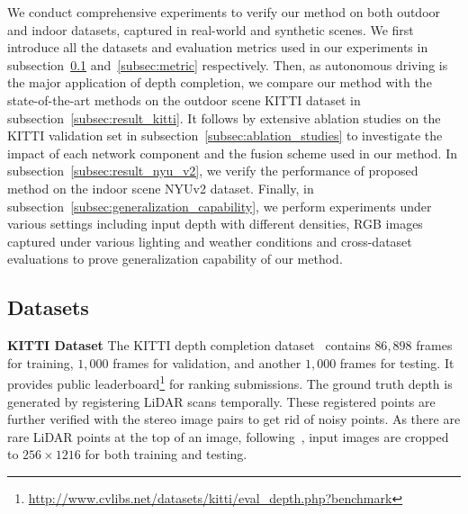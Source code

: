 \documentclass[journal]{IEEEtran}
\begin{document}
We conduct comprehensive experiments to verify our method on both outdoor and indoor datasets, captured in real-world and synthetic scenes.
We first introduce all the datasets and evaluation metrics used in our experiments in subsection~\ref{subsec:dataset} and~\ref{subsec:metric} respectively.
Then, as autonomous driving is the major application of depth completion,
we compare our method with the state-of-the-art methods on the outdoor scene KITTI dataset in subsection~\ref{subsec:result_kitti}.
It follows by extensive ablation studies on the KITTI validation set in subsection~\ref{subsec:ablation_studies} to investigate the impact of each network component and the fusion scheme used in our method.
In subsection~\ref{subsec:result_nyu_v2}, we verify the performance of proposed method on the indoor scene NYUv2 dataset.
Finally, in subsection~\ref{subsec:generalization_capability}, we perform experiments under various settings including input depth with different densities,
RGB images captured under various lighting and weather conditions and cross-dataset evaluations to prove generalization capability of our method. 


\subsection{Datasets}
\label{subsec:dataset}

{\bf KITTI Dataset} The KITTI depth completion dataset~\cite{sparsity_cnn} contains $86,898$ frames for training, $1,000$ frames for validation, and another $1,000$ frames for testing.
It provides public leaderboard\footnote{\url{http://www.cvlibs.net/datasets/kitti/eval_depth.php?benchmark}} for ranking submissions. 
The ground truth depth is generated by registering LiDAR scans temporally.
These registered points are further verified with the stereo image pairs to get rid of noisy points.
As there are rare LiDAR points at the top of an image, following~\cite{sparse_noisy}, input images are cropped to \(256 \times 1216\) for both training and testing.
\end{document}
